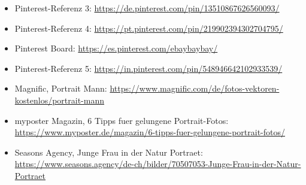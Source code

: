 \documentclass[11pt,a4paper]{article}
\begin{document}
\begin{itemize}
  \item Pinterest-Referenz 3: \url{https://de.pinterest.com/pin/13510867626560093/}
  \item Pinterest-Referenz 4: \url{https://pt.pinterest.com/pin/219902394302704795/}
  \item Pinterest Board: \url{https://es.pinterest.com/ebaybaybay/}
  \item Pinterest-Referenz 5: \url{https://in.pinterest.com/pin/548946642102933539/}
  \item Magnific, Portrait Mann: \url{https://www.magnific.com/de/fotos-vektoren-kostenlos/portrait-mann}
  \item myposter Magazin, 6 Tipps fuer gelungene Portrait-Fotos: \url{https://www.myposter.de/magazin/6-tipps-fuer-gelungene-portrait-fotos/}
  \item Seasons Agency, Junge Frau in der Natur Portraet: \url{https://www.seasons.agency/de-ch/bilder/70507053-Junge-Frau-in-der-Natur-Portraet}
\end{itemize}
\end{document}

